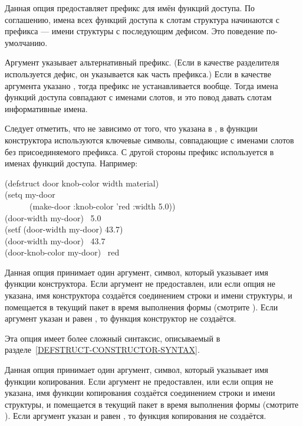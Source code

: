\begin{flushdesc}

\item[\cd{:conc-name}]
Данная опция предоставляет префикс для имён функций доступа.
По соглашению, имена всех функций доступа к слотам структура начинаются с
префикса --- имени структуры с последующим дефисом. Это поведение
по-умолчанию.

Аргумент  указывает альтернативный префикс. (Если в качестве
разделителя используется дефис, он указывается как часть префикса.)
Если в качестве аргумента указано {\false}, тогда префикс не устанавливается
вообще.
Тогда имена функций доступа совпадают с именами слотов, и это повод давать
слотам информативные имена. 

Следует отметить, что не зависимо от того, что указана в , в
функции конструктора используются ключевые символы, совпадающие с именами
слотов без присоединяемого префикса.
С другой стороны префикс используется в именах функций доступа. Например:
\begin{lisp}
(defstruct door knob-color width material) \\
(setq my-door \\
~~~~~~(make-door :knob-color 'red :width 5.0)) \\
(door-width my-door) \EV\ 5.0 \\
(setf (door-width my-door) 43.7) \\
(door-width my-door) \EV\ 43.7 \\
(door-knob-color my-door) \EV\ red
\end{lisp}

\item[\cd{:constructor}]
Данная опция принимает один аргумент, символ, который указывает имя функции
конструктора. Если аргумент не предоставлен, или если опция не указана, имя
конструктора создаётся соединением строки  и имени структуры, и
помещается в текущий пакет в время выполнения формы  (смотрите
).
Если аргумент указан и равен {\fase}, то функция конструктор не создаётся.

Эта опция имеет более сложный синтаксис, описываемый в
разделе~\ref{DEFSTRUCT-CONSTRUCTOR-SYNTAX}.

\item[\cd{:copier}]
Данная опция принимает один аргумент, символ, который указывает имя функции
копирования. Если аргумент не предоставлен, или если опция не указана, имя
функции копирования создаётся соединением строки  и имени структуры, и
помещается в текущий пакет в время выполнения формы  (смотрите
).
Если аргумент указан и равен {\fase}, то функция копирования не создаётся.


\end{flushdesc}
